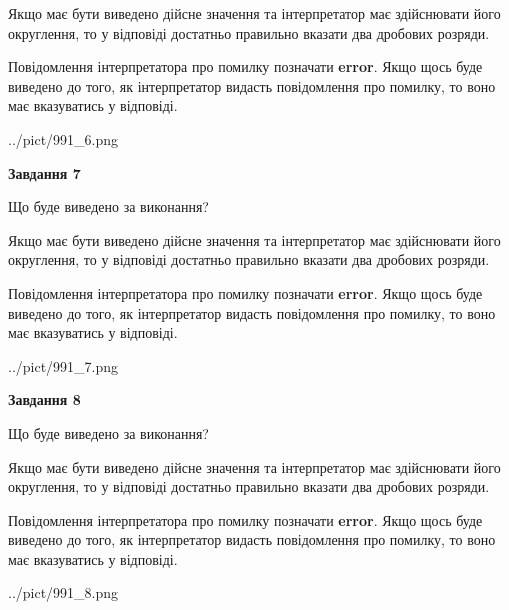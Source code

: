 \documentclass[12pt, ukrainian]{article}
\begin{document}
{\begin {Large}
Якщо має бути виведено дійсне значення та інтерпретатор має здійснювати його округлення, 
то у відповіді достатньо правильно вказати два дробових розряди.

Повідомлення інтерпретатора про помилку позначати \textbf{error}.
Якщо щось буде виведено до того, як інтерпретатор видасть повідомлення про помилку, 
то воно має вказуватись у відповіді. \par

\begin{center}
	{../pict/991_6.png}
\end{center}
\newpage

{\begin {center}\textbf{Завдання 7}\end {center}}\par
Що буде виведено за виконання? \par

Якщо має бути виведено дійсне значення та інтерпретатор має здійснювати його округлення, 
то у відповіді достатньо правильно вказати два дробових розряди.

Повідомлення інтерпретатора про помилку позначати \textbf{error}.
Якщо щось буде виведено до того, як інтерпретатор видасть повідомлення про помилку, 
то воно має вказуватись у відповіді. \par

\begin{center}
	{../pict/991_7.png}
\end{center}
\newpage

{\begin {center}\textbf{Завдання 8}\end {center}}\par
Що буде виведено за виконання? \par

Якщо має бути виведено дійсне значення та інтерпретатор має здійснювати його округлення, 
то у відповіді достатньо правильно вказати два дробових розряди.

Повідомлення інтерпретатора про помилку позначати \textbf{error}.
Якщо щось буде виведено до того, як інтерпретатор видасть повідомлення про помилку, 
то воно має вказуватись у відповіді. \par

\begin{center}
	{../pict/991_8.png}
\end{center}
\newpage


\end{Large}}
\end{document}
